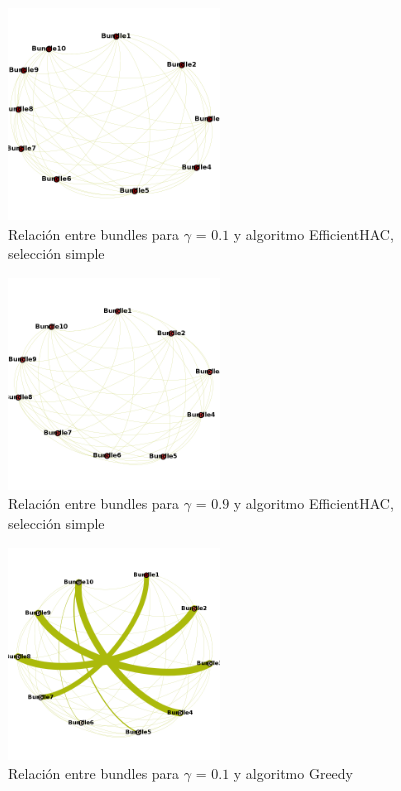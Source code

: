 \begin{figure}[H]
  \centering
    \includegraphics[width=0.5\textwidth]{resultados/authors/intra_inter/effhac01.png}
  \caption{Relación entre bundles para $\gamma$ = $0.1$ y algoritmo EfficientHAC, selección simple}
  \label{res:img-authors-gamma01-effhac}
\end{figure}

\begin{figure}[H]
  \centering
    \includegraphics[width=0.5\textwidth]{resultados/authors/intra_inter/effhac09.png}
  \caption{Relación entre bundles para $\gamma$ = $0.9$ y algoritmo EfficientHAC, selección simple}
  \label{res:img-authors-gamma09-effhac}
\end{figure}

\begin{figure}[H]
  \centering
    \includegraphics[width=0.5\textwidth]{resultados/authors/intra_inter/greedy01.png}
  \caption{Relación entre bundles para $\gamma$ = $0.1$ y algoritmo Greedy}
  \label{res:img-authors-gamma01-greedy}
\end{figure}

